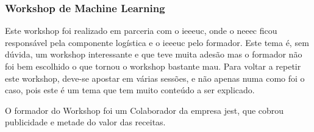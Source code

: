 
\subsubsection{Workshop de Machine Learning}

Este workshop foi realizado em parceria com o \acrlong{ieeeuc}, onde o \acrshort{neeec} ficou responsável pela componente logística e o \acrshort{ieeeuc} pelo formador. Este tema é, sem dúvida, um workshop interessante e que teve muita adesão mas o formador não foi bem escolhido o que tornou o workshop bastante mau. Para voltar a repetir este workshop, deve-se apostar em várias sessões, e não apenas numa como foi o caso, pois este é um tema que tem muito conteúdo a ser explicado.

O formador do Workshop foi um Colaborador da empresa \acrfull{jest}, que cobrou publicidade e metade do valor das receitas.